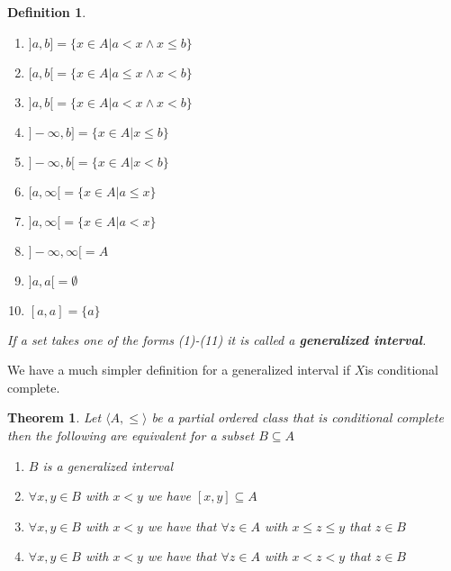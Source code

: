 \documentclass{book}
\newcommand{\tmtextbf}[1]{{\bfseries{#1}}}
\newtheorem{definition}{Definition}
{\theorembodyfont{\rmfamily}\newtheorem{example}{Example}}
\newtheorem{theorem}{Theorem}
\begin{document}
{{\begin{definition}
\begin{enumerate}
    \item $] a, b] = \{ x \in A|a < x \wedge x \leqslant b \}$
    
    \item $[a, b [= \{ x \in A|a \leqslant x \wedge x < b \}$
    
    \item $] a, b [= \{ x \in A|a < x \wedge x < b \}$
    
    \item $] - \infty, b] = \{ x \in A|x \leqslant b \}$
    
    \item $] - \infty, b [= \{ x \in A|x < b \}$
    
    \item $[a, \infty [= \{ x \in A|a \leqslant x \}$
    
    \item $] a, \infty [= \{ x \in A|a < x \}$
    
    \item $] - \infty, \infty [= A$
    
    \item $] a, a [= \emptyset$
    
    \item $[a, a] = \{ a \}$
  \end{enumerate}
  If a set takes one of the forms (1)-(11) it is called a
  \tmtextbf{generalized interval}.
\end{definition}

We have a much simpler definition for a generalized interval if $X$is
conditional complete.

\begin{theorem}
  \label{generalized intervals condition}Let $\langle A, \leqslant \rangle$ be
  a partial ordered class that is conditional complete then the following are
  equivalent for a subset $B \subseteq A$
  \begin{enumerate}
    \item $B$ is a generalized interval
    
    \item $\forall x, y \in B$ with $x < y$ we have $[x, y] \subseteq A$
    
    \item $\forall x, y \in B$ with $x < y$ we have that $\forall z \in A$
    with $x \leqslant z \leqslant y$ that $z \in B$
    
    \item $\forall x, y \in B$ with $x < y$ we have that $\forall z \in A$
    with $x < z < y$ that $z \in B$
  \end{enumerate}
\end{theorem}

}}
\end{document}
